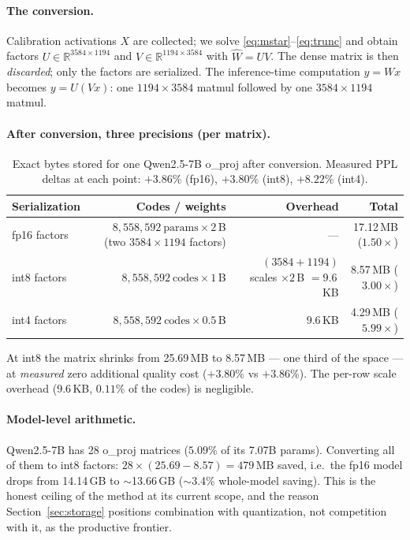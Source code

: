\documentclass[11pt]{article}
\newcommand{\Wh}{\widehat{W}}
\begin{document}
\paragraph{The conversion.} Calibration activations $X$ are collected; we
solve \eqref{eq:mstar}--\eqref{eq:trunc} and obtain factors
$U \in \mathbb{R}^{3584\times1194}$ and $V \in \mathbb{R}^{1194\times3584}$
with $\Wh = UV$. The dense matrix is then \emph{discarded}; only the
factors are serialized. The inference-time computation $y = Wx$ becomes
$y = U(Vx)$: one $1194\times3584$ matmul followed by one
$3584\times1194$ matmul.

\paragraph{After conversion, three precisions (per matrix).}
\begin{table}[h]
\centering
\begin{tabular}{lrrr}
\toprule
Serialization & Codes / weights & Overhead & Total \\
\midrule
fp16 factors  & $8{,}558{,}592\ \text{params} \times 2$\,B (two $3584\times1194$ factors) & --- & 17.12\,MB ($1.50\times$) \\
int8 factors  & $8{,}558{,}592\ \text{codes} \times 1$\,B & $(3584+1194)$ scales $\times 2$\,B $= 9.6$\,KB & 8.57\,MB ($3.00\times$) \\
int4 factors  & $8{,}558{,}592\ \text{codes} \times 0.5$\,B & 9.6\,KB & 4.29\,MB ($5.99\times$) \\
\bottomrule
\end{tabular}
\caption{Exact bytes stored for one Qwen2.5-7B o\_proj after conversion.
Measured PPL deltas at each point: $+3.86\%$ (fp16), $+3.80\%$ (int8),
$+8.22\%$ (int4).}
\label{tab:bytes}
\end{table}

At int8 the matrix shrinks from 25.69\,MB to 8.57\,MB --- one third of the
space --- at \emph{measured} zero additional quality cost ($+3.80\%$ vs
$+3.86\%$). The per-row scale overhead (9.6\,KB, $0.11\%$ of the codes) is
negligible.

\paragraph{Model-level arithmetic.} Qwen2.5-7B has 28 o\_proj matrices
($5.09\%$ of its 7.07B params). Converting all of them to int8 factors:
$28 \times (25.69 - 8.57) = 479$\,MB saved, i.e.\ the fp16 model drops from
14.14\,GB to $\sim$13.66\,GB ($\sim$3.4\% whole-model saving). This is the
honest ceiling of the method at its current scope, and the reason
Section~\ref{sec:storage} positions combination with quantization, not
competition with it, as the productive frontier.
\end{document}
